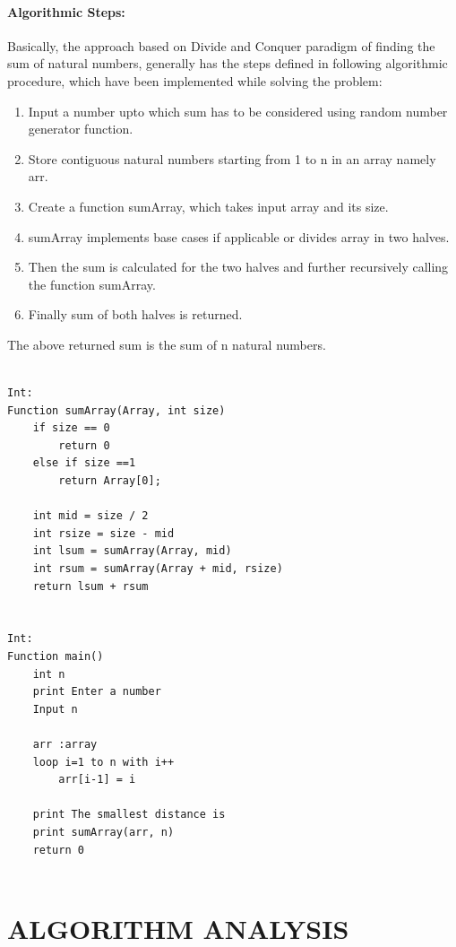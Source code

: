 \documentclass[10pt]{article}
\begin{document}
\begin{multicols*}{2}
\paragraph{Algorithmic Steps:}

Basically, the approach based on Divide and Conquer paradigm of finding the sum of natural numbers, generally has the steps defined in following algorithmic procedure, which have been implemented while solving the problem:
\begin{enumerate}

\item	Input a number upto which sum has to be considered using random number generator function.
\item	Store contiguous natural numbers starting from 1 to n in an array namely arr.
\item	Create a function sumArray, which takes input array and its size.
\item	sumArray implements base cases if applicable or divides array in two halves.
\item	Then the sum is calculated for the two halves and further recursively calling the function sumArray.
\item	Finally sum of both halves is returned.
\end{enumerate}

The above returned sum is the sum of n natural numbers.


\begin{lstlisting}
        
Int:
Function sumArray(Array, int size)
	if size == 0
	    return 0
	else if size ==1
	    return Array[0];
	
	int mid = size / 2
    int rsize = size - mid
    int lsum = sumArray(Array, mid)
    int rsum = sumArray(Array + mid, rsize)
    return lsum + rsum


Int:
Function main()
    int n
    print Enter a number
    Input n
    
    arr :array
    loop i=1 to n with i++
        arr[i-1] = i
    
    print The smallest distance is 
    print sumArray(arr, n)
    return 0


\end{lstlisting}
    

	
\section*{ALGORITHM ANALYSIS} 
	

\end{multicols*}
\end{document}
